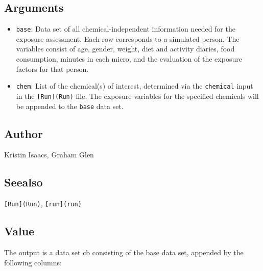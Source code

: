 \documentclass[
]{article}
\providecommand{\tightlist}{%
  \setlength{\itemsep}{0pt}\setlength{\parskip}{0pt}}
\begin{document}
\hypertarget{arguments-25}{%
\subsection{Arguments}\label{arguments-25}}

\begin{itemize}
\tightlist
\item
  \texttt{base}: Data set of all chemical-independent information needed
  for the exposure assessment. Each row corresponds to a simulated
  person. The variables consist of age, gender, weight, diet and
  activity diaries, food consumption, minutes in each micro, and the
  evaluation of the exposure factors for that person.
\item
  \texttt{chem}: List of the chemical(s) of interest, determined via the
  \texttt{chemical} input in the \texttt{{[}Run{]}(Run)} file. The
  exposure variables for the specified chemicals will be appended to the
  \texttt{base} data set.
\end{itemize}

\hypertarget{author-22}{%
\subsection{Author}\label{author-22}}

Kristin Isaacs, Graham Glen

\hypertarget{seealso-18}{%
\subsection{Seealso}\label{seealso-18}}

\texttt{{[}Run{]}(Run)}, \texttt{{[}run{]}(run)}

\hypertarget{value-23}{%
\subsection{Value}\label{value-23}}

The output is a data set cb consisting of the base data set, appended by
the following columns:
\end{document}
